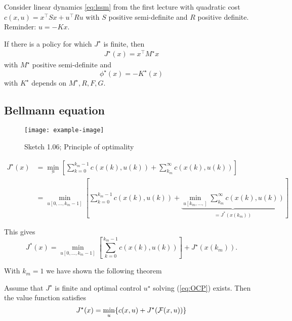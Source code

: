 \begin{example}
    Consider linear dynamics \ref{eq:lssm} %
     from the first lecture with 
    quadratic cost \(c(x,u)=x^\intercal Sx+u^\intercal Ru\) with \(S\) positive semi-definite and 
    \(R\) positive definite.
    Reminder: \(u=-Kx\).

    If there is a policy for which \(J^\star\) is finite, then 
    \begin{align*}
        J^\star(x)=x^\intercal M^\star x
    \end{align*}
    with \(M^\star\) positive semi-definite and 
    \[\phi^\star(x)=-K^\star(x)\]
    with \(K^\star\) depends on \(M^\star,R,F,G\). 
\end{example}

\subsection*{Bellmann equation}
\begin{figure}[H]\label{fig:1.06}
    \centering
    \texttt{[image: example-image]}
    \caption{Sketch 1.06; Principle of optimality}
\end{figure}


\begin{align*}
    J^\star(x)&=\min_{\underbar{u}}\left[\sum_{k=0}^{k_m-1}c(x(k),u(k))+\sum_{k_m}^\infty c(x(k),u(k))\right]\\
    &=\min_{u[0,\dots,k_m-1]}\left[\sum_{k=0}^{k_m-1}c(x(k),u(k))+\underbrace{\min_{u[k_m,\dots,]}\sum_{k_m}^\infty c(x(k),u(k))}_{=J^*(x(k_m))}\right]
\end{align*}

This gives 
\[J^*(x)=\min_{u[0,\dots,k_m-1]}\left[\sum_{k=0}^{k_m-1}c(x(k),u(k))\right]+J^\star(x(k_m)).\]

With \(k_m=1\) we have shown the following theorem 
\begin{theorem}\label{thm:1.13}
    Assume that \(J^\star\) is finite and optimal control \(u^\star\) solving (\ref{eq:OCP}) exists.
    Then the value function satisfies 
    \begin{equation}\label{eq:bellmann}
        J^\star(x)=\min_{u}\{c(x,u)+J^\star(\mathcal{F}(x,u))\}
    \end{equation}
\end{theorem}

